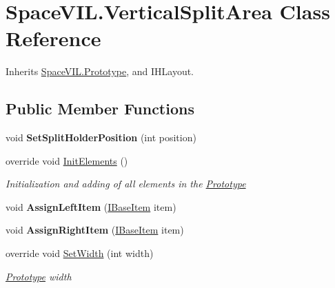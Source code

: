 \hypertarget{class_space_v_i_l_1_1_vertical_split_area}{}\section{Space\+V\+I\+L.\+Vertical\+Split\+Area Class Reference}
\label{class_space_v_i_l_1_1_vertical_split_area}


Inherits \mbox{\hyperlink{class_space_v_i_l_1_1_prototype}{Space\+V\+I\+L.\+Prototype}}, and I\+H\+Layout.

\subsection*{Public Member Functions}
\begin{DoxyCompactItemize}
\item 
\mbox{\label{class_space_v_i_l_1_1_vertical_split_area_a8aa51b2b1d21e1a0d788a21e9027ca4f}} 
void {\bfseries Set\+Split\+Holder\+Position} (int position)
\item 
override void \mbox{\hyperlink{class_space_v_i_l_1_1_vertical_split_area_ac00bf6f3d89b83dadcdd05f6e95b97d8}{Init\+Elements}} ()
\begin{DoxyCompactList}\small\item\em Initialization and adding of all elements in the \mbox{\hyperlink{class_space_v_i_l_1_1_prototype}{Prototype}} \end{DoxyCompactList}\item 
\mbox{\label{class_space_v_i_l_1_1_vertical_split_area_a2b226695a4f66447246db5923f3465b3}} 
void {\bfseries Assign\+Left\+Item} (\mbox{\hyperlink{interface_space_v_i_l_1_1_core_1_1_i_base_item}{I\+Base\+Item}} item)
\item 
\mbox{\label{class_space_v_i_l_1_1_vertical_split_area_a3cc27337a3ec6eb3c25e9420fac2eef1}} 
void {\bfseries Assign\+Right\+Item} (\mbox{\hyperlink{interface_space_v_i_l_1_1_core_1_1_i_base_item}{I\+Base\+Item}} item)
\item 
override void \mbox{\hyperlink{class_space_v_i_l_1_1_vertical_split_area_a665c01c8beced7686b57b7f4d41f3b70}{Set\+Width}} (int width)
\begin{DoxyCompactList}\small\item\em \mbox{\hyperlink{class_space_v_i_l_1_1_prototype}{Prototype}} width \end{DoxyCompactList}\item 

\end{DoxyCompactItemize}
